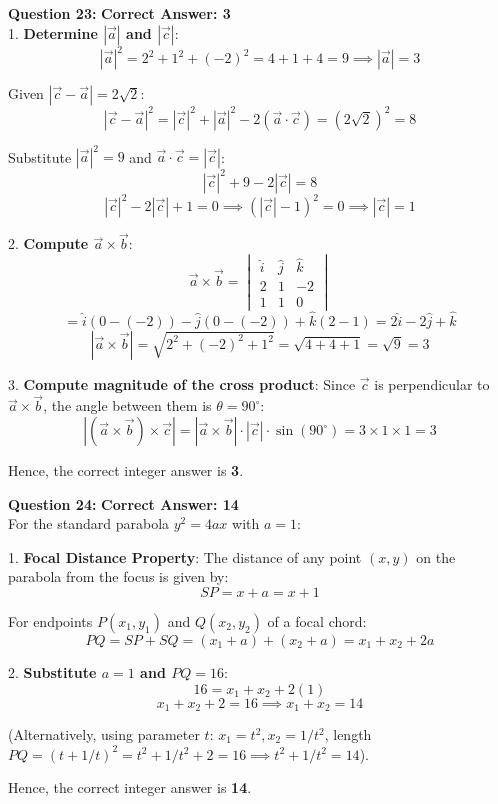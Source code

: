 \documentclass[11pt,a4paper]{article}
\begin{document}
\begin{tcolorbox}[solbox]
\textbf{\textcolor{primaryDark}{Question 23:}} \hfill \textbf{\textcolor{l1Green}{Correct Answer: 3}}\\
\vspace{4pt}
1. \textbf{Determine $|\vec{a}|$ and $|\vec{c}|$}:
$$|\vec{a}|^2 = 2^2 + 1^2 + (-2)^2 = 4 + 1 + 4 = 9 \implies |\vec{a}| = 3$$

Given $|\vec{c} - \vec{a}| = 2\sqrt{2}$:
$$|\vec{c} - \vec{a}|^2 = |\vec{c}|^2 + |\vec{a}|^2 - 2(\vec{a} \cdot \vec{c}) = (2\sqrt{2})^2 = 8$$

Substitute $|\vec{a}|^2 = 9$ and $\vec{a} \cdot \vec{c} = |\vec{c}|$:
$$|\vec{c}|^2 + 9 - 2|\vec{c}| = 8$$
$$|\vec{c}|^2 - 2|\vec{c}| + 1 = 0 \implies (|\vec{c}| - 1)^2 = 0 \implies |\vec{c}| = 1$$

2. \textbf{Compute $\vec{a} \times \vec{b}$}:
$$\vec{a} \times \vec{b} = \begin{vmatrix} \hat{i} & \hat{j} & \hat{k} \\ 2 & 1 & -2 \\ 1 & 1 & 0 \end{vmatrix}$$
$$= \hat{i}(0 - (-2)) - \hat{j}(0 - (-2)) + \hat{k}(2 - 1) = 2\hat{i} - 2\hat{j} + \hat{k}$$
$$|\vec{a} \times \vec{b}| = \sqrt{2^2 + (-2)^2 + 1^2} = \sqrt{4 + 4 + 1} = \sqrt{9} = 3$$

3. \textbf{Compute magnitude of the cross product}:
Since $\vec{c}$ is perpendicular to $\vec{a} \times \vec{b}$, the angle between them is $\theta = 90^\circ$:
$$|(\vec{a} \times \vec{b}) \times \vec{c}| = |\vec{a} \times \vec{b}| \cdot |\vec{c}| \cdot \sin(90^\circ) = 3 \times 1 \times 1 = 3$$

Hence, the correct integer answer is \textbf{3}.
\end{tcolorbox}

\begin{tcolorbox}[solbox]
\textbf{\textcolor{primaryDark}{Question 24:}} \hfill \textbf{\textcolor{l1Green}{Correct Answer: 14}}\\
\vspace{4pt}
For the standard parabola $y^2 = 4ax$ with $a = 1$:

1. \textbf{Focal Distance Property}:
The distance of any point $(x, y)$ on the parabola from the focus is given by:
$$SP = x + a = x + 1$$

For endpoints $P(x_1, y_1)$ and $Q(x_2, y_2)$ of a focal chord:
$$PQ = SP + SQ = (x_1 + a) + (x_2 + a) = x_1 + x_2 + 2a$$

2. \textbf{Substitute $a = 1$ and $PQ = 16$}:
$$16 = x_1 + x_2 + 2(1)$$
$$x_1 + x_2 + 2 = 16 \implies x_1 + x_2 = 14$$

(Alternatively, using parameter $t$: $x_1 = t^2, x_2 = 1/t^2$, length $PQ = (t + 1/t)^2 = t^2 + 1/t^2 + 2 = 16 \implies t^2 + 1/t^2 = 14$).

Hence, the correct integer answer is \textbf{14}.
\end{tcolorbox}
\end{document}
